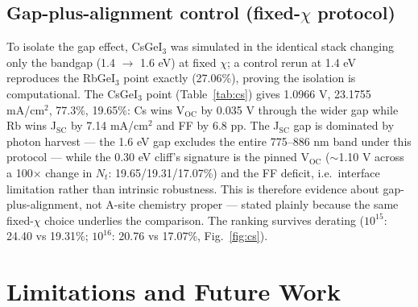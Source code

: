 \documentclass[aip,jap,amsmath,amssymb,preprint]{revtex4-2}
\begin{document}
\subsection{Gap-plus-alignment control (fixed-$\chi$ protocol)}
To isolate the gap effect, CsGeI$_{3}$ was simulated in the identical stack changing only the bandgap (1.4 $\rightarrow$ 1.6 eV) at fixed $\chi$; a control rerun at 1.4 eV reproduces the RbGeI$_{3}$ point exactly (27.06\%), proving the isolation is computational. The CsGeI$_{3}$ point (Table~\ref{tab:cs}) gives 1.0966 V, 23.1755 mA/cm$^{2}$, 77.3\%, 19.65\%: Cs wins V$_{\mathrm{OC}}$ by 0.035 V through the wider gap while Rb wins J$_{\mathrm{SC}}$ by 7.14 mA/cm$^{2}$ and FF by 6.8 pp. The J$_{\mathrm{SC}}$ gap is dominated by photon harvest --- the 1.6 eV gap excludes the entire 775--886 nm band under this protocol --- while the 0.30 eV cliff's signature is the pinned V$_{\mathrm{OC}}$ ($\sim$1.10 V across a 100$\times$ change in $N_{t}$: 19.65/19.31/17.07\%) and the FF deficit, i.e.\ interface limitation rather than intrinsic robustness. This is therefore evidence about gap-plus-alignment, not A-site chemistry proper --- stated plainly because the same fixed-$\chi$ choice underlies the comparison. The ranking survives derating ($10^{15}$: 24.40 vs 19.31\%; $10^{16}$: 20.76 vs 17.07\%, Fig.~\ref{fig:cs}).


\section{Limitations and Future Work}
\end{document}
